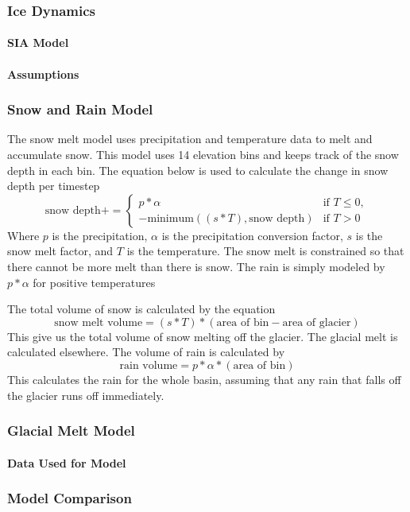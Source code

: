 \documentclass{article}
\begin{document}
\subsubsection{Ice Dynamics}
\paragraph{SIA Model} 
\paragraph{Assumptions}

\subsubsection{Snow and Rain Model}
The snow melt model uses precipitation and temperature data to melt and accumulate snow. This model uses 14 elevation bins and keeps track 
of the snow depth in each bin. The equation below is used to calculate the change in snow depth per timestep 
$$\text{snow depth} += 
\begin{cases} 
  p*\alpha & \text{if } T \leq 0,\\
  -\text{minimum}((s*T),\text{snow depth}) & \text{if } T > 0
\end{cases}$$
Where $p$ is the precipitation, $\alpha$ is the precipitation conversion factor, $s$ is the snow melt factor, and $T$ is 
the temperature. The snow melt is constrained so that there cannot be more melt than there is snow. The rain is simply modeled by $p*\alpha$ 
for positive temperatures

The total volume of snow is calculated by the equation
$$\text{snow melt volume}=(s*T)*(\text{area of bin}-\text{area of glacier})$$
This give us the total volume of snow melting off the glacier. The glacial melt is calculated elsewhere. The volume of rain is calculated by
$$\text{rain volume}=p*\alpha*(\text{area of bin})$$
This calculates the rain for the whole basin, assuming that any rain that falls off the glacier runs off immediately.
\subsubsection{Glacial Melt Model}
\paragraph{Data Used for Model}

\subsubsection{Model Comparison}
\end{document}

